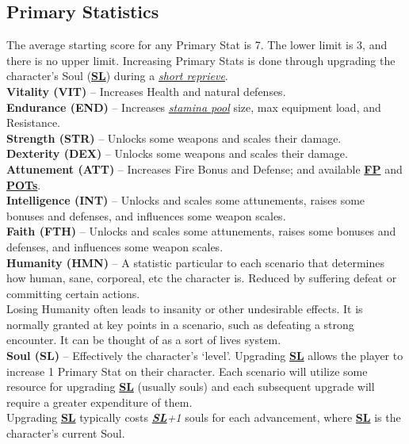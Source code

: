 \documentclass[12pt]{article}
\newcommand{\refto}[1]{\hyperlink{#1}{\textbf{#1}}}
\newcommand{\makeref}[1]{\hypertarget{#1}{\textbf{#1}}}
\newcommand{\reftoit}[1]{\hyperlink{#1}{\emph{#1}}}
\begin{document}
\begin{multicols*}{2}
\subsection{Primary Statistics}
The average starting score for any Primary Stat is 7. The lower limit is 3, and there is no upper limit. Increasing Primary Stats is done through upgrading the character’s Soul (\refto{SL}) during a \reftoit{short reprieve}.\\

\textbf{Vitality (\makeref{VIT})} – Increases Health and natural defenses.\\
\textbf{Endurance (\makeref{END})} – Increases \reftoit{stamina pool} size, max equipment load, and Resistance.\\
\textbf{Strength (\makeref{STR})} – Unlocks some weapons and scales their damage.\\
\textbf{Dexterity (\makeref{DEX})} – Unlocks some weapons and scales their damage.\\
\textbf{Attunement (\makeref{ATT})} – Increases Fire Bonus and Defense; and available \refto{FP} and \refto{POTs}.\\
\textbf{Intelligence (\makeref{INT})} – Unlocks and scales some attunements, raises some bonuses and defenses, and influences some weapon scales.\\
\textbf{Faith (\makeref{FTH})} – Unlocks and scales some attunements, raises some bonuses and defenses, and influences some weapon scales.\\
\textbf{Humanity (\makeref{HMN})} – A statistic particular to each scenario that determines how human, sane, corporeal, etc the character is. Reduced by suffering defeat or committing certain actions.\\ Losing Humanity often leads to insanity or other undesirable effects. It is normally granted at key points in a scenario, such as defeating a strong encounter. It can be thought of as a sort of lives system.\\
\textbf{Soul (\makeref{SL})} – Effectively the character’s ‘level’. Upgrading \refto{SL} allows the player to increase 1 Primary Stat on their character. Each scenario will utilize some resource for upgrading \refto{SL} (usually souls) and each subsequent upgrade will require a greater expenditure of them.\\
Upgrading \refto{SL} typically costs \emph{\refto{SL}+1} souls for each advancement, where \refto{SL} is the character’s current Soul.

\vfill


\end{multicols*}
\end{document}
